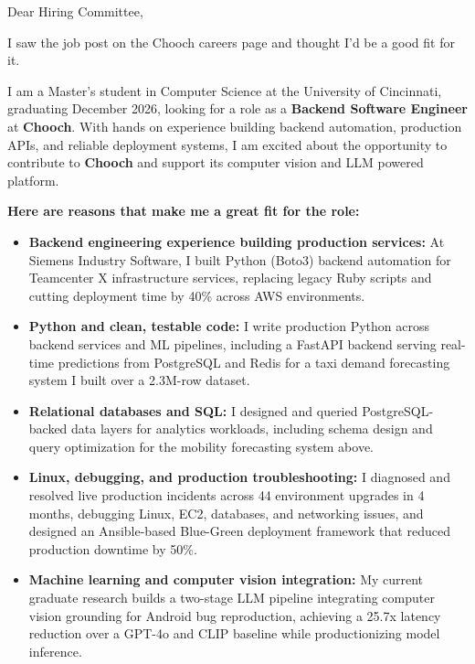 \documentclass[11pt]{letter}
\date{}
\begin{document}
\begin{letter}{}

\opening{Dear Hiring Committee,}

I saw the job post on the Chooch careers page and thought I'd be a good fit for it.

I am a Master's student in Computer Science at the University of Cincinnati, graduating December 2026, looking for a role as a \textbf{Backend Software Engineer} at \textbf{Chooch}. With hands on experience building backend automation, production APIs, and reliable deployment systems, I am excited about the opportunity to contribute to \textbf{Chooch} and support its computer vision and LLM powered platform.

\textbf{Here are reasons that make me a great fit for the role:}

\begin{itemize}[leftmargin=*, itemsep=0.45em]
    \item \textbf{Backend engineering experience building production services:} At Siemens Industry Software, I built Python (Boto3) backend automation for Teamcenter X infrastructure services, replacing legacy Ruby scripts and cutting deployment time by 40\% across AWS environments.

    \item \textbf{Python and clean, testable code:} I write production Python across backend services and ML pipelines, including a FastAPI backend serving real-time predictions from PostgreSQL and Redis for a taxi demand forecasting system I built over a 2.3M-row dataset.

    \item \textbf{Relational databases and SQL:} I designed and queried PostgreSQL-backed data layers for analytics workloads, including schema design and query optimization for the mobility forecasting system above.

    \item \textbf{Linux, debugging, and production troubleshooting:} I diagnosed and resolved live production incidents across 44 environment upgrades in 4 months, debugging Linux, EC2, databases, and networking issues, and designed an Ansible-based Blue-Green deployment framework that reduced production downtime by 50\%.

    \item \textbf{Machine learning and computer vision integration:} My current graduate research builds a two-stage LLM pipeline integrating computer vision grounding for Android bug reproduction, achieving a 25.7x latency reduction over a GPT-4o and CLIP baseline while productionizing model inference.
\end{itemize}


\end{letter}
\end{document}
